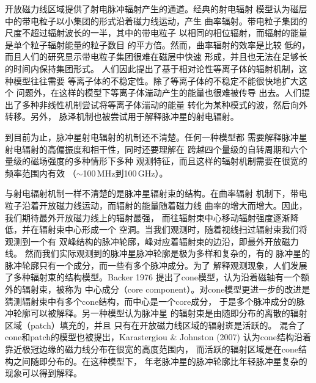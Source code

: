 开放磁力线区域提供了射电脉冲辐射产生的通道。经典的射电辐射
模型认为磁层中的带电粒子以小集团的形式沿着磁力线运动，产生
曲率辐射。带电粒子集团的尺度不超过辐射波长的一半，其中的带电粒子
以相同的相位辐射，而辐射的能量是单个粒子辐射能量的粒子数目
的平方倍\supercite{kom70,rs75}。然而，曲率辐射的效率是比较
低的，而且人们的研究显示带电粒子集团很难在磁层中快速
形成，并且也无法在足够长的时间内保持集团形式\supercite{mel92}。
人们因此提出了基于相对论性等离子体的辐射机制，这种模型往往需要
等离子体的不稳定性。除了等离子体的不稳定不能很快地扩大这个
问题外，在这样的模型下等离子体湍动产生的能量也很难被传导
出去。人们提出了多种非线性机制尝试将等离子体湍动的能量
转化为某种模式的波，然后向外转移\supercite{mel92}。另外，
脉泽机制也被尝试用于解释脉冲星的射电辐射\supercite{mel89}。

到目前为止，脉冲星射电辐射的机制还不清楚。任何一种模型都
需要解释脉冲星射电辐射的高偏振度和相干性，同时还要理解在
跨越四个量级的自转周期和六个量级的磁场强度的多种情形下多种
观测特征，而且这样的辐射机制需要在很宽的频率范围内有效
（$\sim$100\,MHz到100\,GHz）。

与射电辐射机制一样不清楚的是脉冲星辐射束的结构。在曲率辐射
机制下，带电粒子沿着开放磁力线运动，而辐射的能量随着磁力线
曲率的增大而增大。因此，我们期待最外开放磁力线上的辐射最强，
而往辐射束中心移动辐射强度逐渐降低，并在辐射束中心形成一个
空洞。当我们观测时，随着视线扫过辐射束我们将观测到一个有
双峰结构的脉冲轮廓，峰对应着辐射束的边沿，即最外开放磁力线。
然而我们实际观测到的脉冲星脉冲轮廓是极为多样和复杂的，有的
脉冲星的脉冲轮廓只有一个成分，而一些有多个脉冲成分。为了
解释观测现象，人们发展了多种辐射束的结构模型。Backer 1976\supercite{bac76}
提出了cone模型，认为沿着磁轴有一个额外的辐射束，被称为
中心成分（core component）。对cone模型更进一步的改进是
猜测辐射束中有多个cone结构，而中心是一个core成分\supercite{os76,os77,Rankin93,gks93}，
于是多个脉冲成分的脉冲轮廓可以被解释。另一种模型认为脉冲星
的辐射束是由随即分布的离散的辐射区域（patch）填充的，并且
只有在开放磁力线区域的辐射斑是活跃的\supercite{Lyne88}。
混合了cone和patch的模型也被提出，Karastergiou \& Johnston (2007)\supercite{Kara07}
认为cone结构沿着靠近极冠边缘的磁力线分布在很宽的高度范围内，
而活跃的辐射区域是在cone结构之间随即分布的。在这种模型下，
年老脉冲星的脉冲轮廓比年轻脉冲星复杂的现象可以得到解释。

